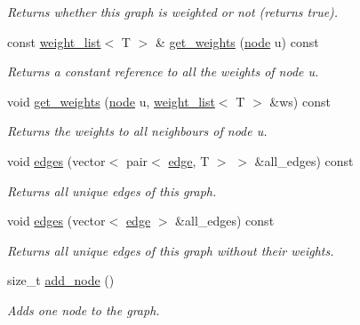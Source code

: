 \begin{DoxyCompactItemize}
\begin{DoxyCompactList}\small\item\em Returns whether this graph is weighted or not (returns true). \end{DoxyCompactList}\item 
const \hyperlink{namespacelgraph_1_1utils_a11e7963f3637ea13778b8d3e69d2c17f}{weight\-\_\-list}$<$ T $>$ \& \hyperlink{classlgraph_1_1utils_1_1wxgraph_a06252e99191d39329947c3a5eef43e73}{get\-\_\-weights} (\hyperlink{namespacelgraph_1_1utils_a7bd66ede3805ef121bc2835bd48de0cf}{node} u) const 
\begin{DoxyCompactList}\small\item\em Returns a constant reference to all the weights of node {\itshape u}. \end{DoxyCompactList}\item 
void \hyperlink{classlgraph_1_1utils_1_1wxgraph_a23c629eb031e31681749da793f933548}{get\-\_\-weights} (\hyperlink{namespacelgraph_1_1utils_a7bd66ede3805ef121bc2835bd48de0cf}{node} u, \hyperlink{namespacelgraph_1_1utils_a11e7963f3637ea13778b8d3e69d2c17f}{weight\-\_\-list}$<$ T $>$ \&ws) const 
\begin{DoxyCompactList}\small\item\em Returns the weights to all neighbours of node {\itshape u}. \end{DoxyCompactList}\item 
void \hyperlink{classlgraph_1_1utils_1_1wxgraph_a73b6c8887d5088750ee2cc98c45089c6}{edges} (vector$<$ pair$<$ \hyperlink{namespacelgraph_1_1utils_a6510284ce1b1ae5dc97ce5d2de426e10}{edge}, T $>$ $>$ \&all\-\_\-edges) const 
\begin{DoxyCompactList}\small\item\em Returns all unique edges of this graph. \end{DoxyCompactList}\item 
void \hyperlink{classlgraph_1_1utils_1_1wxgraph_a6c58b1f9bd596b3a12c181119eee9da2}{edges} (vector$<$ \hyperlink{namespacelgraph_1_1utils_a6510284ce1b1ae5dc97ce5d2de426e10}{edge} $>$ \&all\-\_\-edges) const 
\begin{DoxyCompactList}\small\item\em Returns all unique edges of this graph without their weights. \end{DoxyCompactList}\item 
size\-\_\-t \hyperlink{classlgraph_1_1utils_1_1xxgraph_af41baf2c098e872731ad646aeec1b382}{add\-\_\-node} ()
\begin{DoxyCompactList}\small\item\em Adds one node to the graph. \end{DoxyCompactList}\item 

\end{DoxyCompactItemize}
